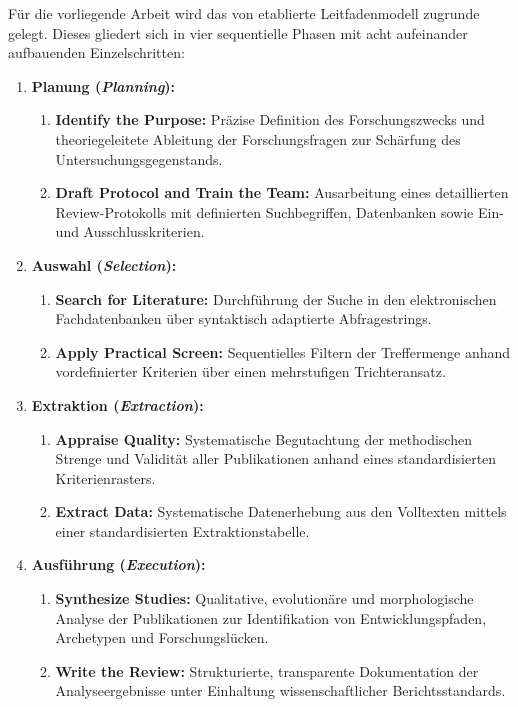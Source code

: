 Für die vorliegende Arbeit wird das von \textcite[S.~882 bis 905]{2NHFUF5N} etablierte Leitfadenmodell zugrunde gelegt. Dieses gliedert sich in vier sequentielle Phasen mit acht aufeinander aufbauenden Einzelschritten:
\begin{enumerate}[label=\textbf{Phase \arabic*:}, leftmargin=*]
  \item \textbf{Planung (\textit{Planning}):} 
  \begin{enumerate}[label=\textbf{Schritt \arabic*:}, leftmargin=*]
    \item \textbf{Identify the Purpose:} Präzise Definition des Forschungszwecks und theoriegeleitete Ableitung der Forschungsfragen zur Schärfung des Untersuchungsgegenstands.
    \item \textbf{Draft Protocol and Train the Team:} Ausarbeitung eines detaillierten Review-Protokolls mit definierten Suchbegriffen, Datenbanken sowie Ein- und Ausschlusskriterien.
  \end{enumerate}
  \item \textbf{Auswahl (\textit{Selection}):}
  \begin{enumerate}[start=3, label=\textbf{Schritt \arabic*:}, leftmargin=*]
    \item \textbf{Search for Literature:} Durchführung der Suche in den elektronischen Fachdatenbanken über syntaktisch adaptierte Abfragestrings.
    \item \textbf{Apply Practical Screen:} Sequentielles Filtern der Treffermenge anhand vordefinierter Kriterien über einen mehrstufigen Trichteransatz.
  \end{enumerate}
  \item \textbf{Extraktion (\textit{Extraction}):}
  \begin{enumerate}[start=5, label=\textbf{Schritt \arabic*:}, leftmargin=*]
    \item \textbf{Appraise Quality:} Systematische Begutachtung der methodischen Strenge und Validität aller Publikationen anhand eines standardisierten Kriterienrasters.
    \item \textbf{Extract Data:} Systematische Datenerhebung aus den Volltexten mittels einer standardisierten Extraktionstabelle.
  \end{enumerate}
  \item \textbf{Ausführung (\textit{Execution}):}
  \begin{enumerate}[start=7, label=\textbf{Schritt \arabic*:}, leftmargin=*]
    \item \textbf{Synthesize Studies:} Qualitative, evolutionäre und morphologische Analyse der Publikationen zur Identifikation von Entwicklungspfaden, Archetypen und Forschungslücken.
    \item \textbf{Write the Review:} Strukturierte, transparente Dokumentation der Analyseergebnisse unter Einhaltung wissenschaftlicher Berichtsstandards.
  \end{enumerate}
\end{enumerate}

